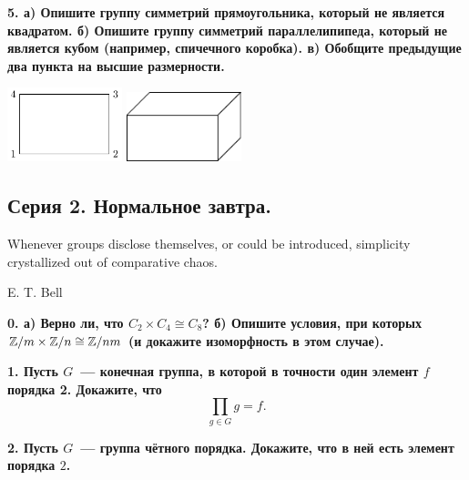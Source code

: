 \documentclass[12pt, oneside, dvipsnames]{extarticle}
\begin{document}
	\bf{5.} а) Опишите группу симметрий прямоугольника, который не является квадратом. б) Опишите группу симметрий параллелипипеда, который не является кубом (например, спичечного коробка). в) Обобщите предыдущие два пункта на высшие размерности. 

	\begin{center}
	\begin{minipage}{6in}
		\includegraphics[width=0.25\textwidth]{papers/print/pic/pic_1.pdf}
		\hspace{10mm}
		\includegraphics[width=0.25\textwidth]{papers/print/pic/pic_2.pdf}
	\end{minipage}
	\end{center} 

	\begin{center}
	\subsection*{Серия 2. Нормальное завтра. }
	\end{center}

	\epigraph{Whenever groups disclose themselves, or could be introduced, simplicity crystallized out of comparative chaos.}{E. T. Bell}


	\bf{0.} а) Верно ли, что $C_{2} \times C_{4} \cong C_{8}$? б) Опишите условия, при которых  $\mathbb{Z}/m \times \mathbb{Z}/n \cong \mathbb{Z}/nm$ (и докажите изоморфность в этом случае). 


	\bf{1.} Пусть $G$~--- конечная группа, в которой в точности один элемент $f$ порядка 2. Докажите, что 
	\[
		\prod_{g \in G} g = f.
	\]

	\bf{2.} Пусть $G$~--- группа чётного порядка. Докажите, что в ней есть элемент порядка $2$. 
\end{document}
